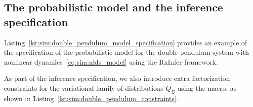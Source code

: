 \subsection{The probabilistic model and the inference specification}

Listing~\ref{lst:sim:double_pendulum_model_specification} provides an example of the specification of the 
probabilistic model for the double pendulum system with nonlinear
dynamics~\eqref{eq:sim:nlds_model} using the RxInfer
framework.
\begin{figure*}
  \begin{adjustbox}{minipage=\textwidth,margin=0pt \smallskipamount,center}
  \end{adjustbox}
\end{figure*}
As part of the inference specification, we also introduce extra factorization constraints for
the variational family of distributions $Q_{B}$ using the  macro, as shown
in Listing~\eqref{lst:sim:double_pendulum_constraints}. 


